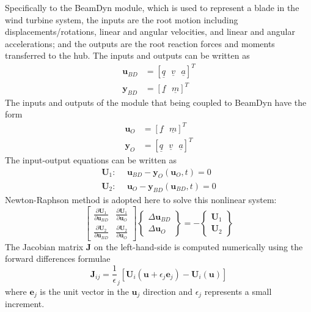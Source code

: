 \documentclass{aiaa-tc}
\renewcommand{\vec}[1]{\underline{#1}}
\begin{document}
Specifically to the BeamDyn module, which is used to represent a blade in the wind turbine system, the inputs are the root motion including displacements/rotations, linear and angular velocities, and linear and angular accelerations; and the outputs are the root reaction forces and moments transferred to the hub. The inputs and outputs can be written as
\begin{align}
    \label{BDInput}
    \mathbf{u}_{BD} &= \left[ \vec{q}~~~\vec{v}~~~\vec{a}\right]^T \\
    \label{BDOutput}
    \mathbf{y}_{BD} &= \left[ \vec{f}~~~\vec{m} \right]^T
\end{align}
The inputs and outputs of the module that being coupled to BeamDyn have the form
\begin{align}
    \label{OtherInput}
    \mathbf{u}_{O} &= \left[ \vec{f}~~~\vec{m} \right]^T\\
    \label{OtherOutput}
    \mathbf{y}_{O} &= \left[ \vec{q}~~~\vec{v}~~~\vec{a}\right]^T 
\end{align}
The input-output equations can be written as
\begin{align}
    \label{IOEq1}
    \mathbf{U}_1: ~~&\mathbf{u}_{BD} - \mathbf{y}_{O} (\mathbf{u}_O,t)= 0 \\
    \label{IOEq2}
     \mathbf{U}_2: ~~&\mathbf{u}_{O} - \mathbf{y}_{BD}(\mathbf{u}_{BD},t) = 0
\end{align}
Newton-Raphson method is adopted here to solve this nonlinear system: 
\begin{equation}
    \label{NREq}
    \begin{bmatrix}
    \frac{\partial \mathbf{U}_1}{\partial \mathbf{u}_{BD}}  &  \frac{\partial \mathbf{U}_{1}}{\partial \mathbf{u}_{O}} \\
    \frac{\partial \mathbf{U}_2}{\partial \mathbf{u}_{BD}}  &  \frac{\partial \mathbf{U}_{2}}{\partial \mathbf{u}_{O}} 
    \end{bmatrix}
    \begin{Bmatrix}
     \Delta \mathbf{u}_{BD} \\
     \Delta \mathbf{u}_{O}
    \end{Bmatrix} 
    =
    -
    \begin{Bmatrix}
     \mathbf{U}_1 \\
     \mathbf{U}_2
    \end{Bmatrix}
\end{equation}
 The Jacobian matrix $\mathbf{J}$ on the left-hand-side is computed numerically using the forward differences formulae
 \begin{equation}
     \label{Jacobian}
     \mathbf{J}_{ij} = \frac{1}{\epsilon}_j \left[\mathbf{U}_i(\mathbf{u}+\epsilon_j \mathbf{e}_j) - \mathbf{U}_i(\mathbf{u}) \right]
 \end{equation}
 where $\mathbf{e}_j$ is the unit vector in the $\mathbf{u}_j$ direction and $\epsilon_j$ represents a small increment.
 
\end{document}
